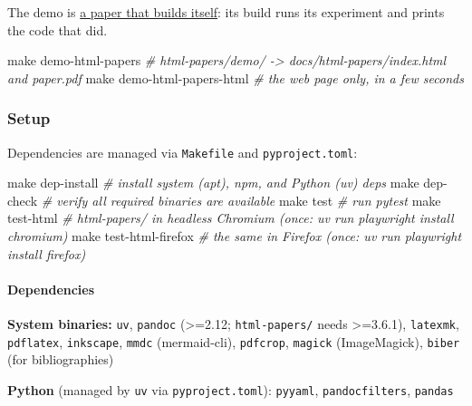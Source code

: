 \documentclass[
]{article}
\newenvironment{Shaded}{}{}
\newcommand{\CommentTok}[1]{\textcolor[rgb]{0.38,0.63,0.69}{\textit{#1}}}
\newcommand{\FunctionTok}[1]{\textcolor[rgb]{0.02,0.16,0.49}{#1}}
\newcommand{\NormalTok}[1]{#1}
\begin{document}
The demo is \href{https://mivanit.github.io/pandoc-utils/html-papers/}{a
paper that builds itself}: its build runs its experiment and prints the
code that did.

\begin{Shaded}
\begin{Highlighting}[]
\FunctionTok{make}\NormalTok{ demo{-}html{-}papers        }\CommentTok{\# html{-}papers/demo/ {-}\textgreater{} docs/html{-}papers/index.html and paper.pdf}
\FunctionTok{make}\NormalTok{ demo{-}html{-}papers{-}html   }\CommentTok{\# the web page only, in a few seconds}
\end{Highlighting}
\end{Shaded}

\subsubsection{Setup}\label{setup}

Dependencies are managed via \texttt{Makefile} and
\texttt{pyproject.toml}:

\begin{Shaded}
\begin{Highlighting}[]
\FunctionTok{make}\NormalTok{ dep{-}install   }\CommentTok{\# install system (apt), npm, and Python (uv) deps}
\FunctionTok{make}\NormalTok{ dep{-}check     }\CommentTok{\# verify all required binaries are available}
\FunctionTok{make}\NormalTok{ test          }\CommentTok{\# run pytest}
\FunctionTok{make}\NormalTok{ test{-}html     }\CommentTok{\# html{-}papers/ in headless Chromium (once: uv run playwright install chromium)}
\FunctionTok{make}\NormalTok{ test{-}html{-}firefox  }\CommentTok{\# the same in Firefox (once: uv run playwright install firefox)}
\end{Highlighting}
\end{Shaded}

\paragraph{Dependencies}\label{dependencies}

\textbf{System binaries:} \texttt{uv}, \texttt{pandoc}
(\textgreater=2.12; \texttt{html-papers/} needs \textgreater=3.6.1),
\texttt{latexmk}, \texttt{pdflatex}, \texttt{inkscape}, \texttt{mmdc}
(mermaid-cli), \texttt{pdfcrop}, \texttt{magick} (ImageMagick),
\texttt{biber} (for bibliographies)

\textbf{Python} (managed by \texttt{uv} via \texttt{pyproject.toml}):
\texttt{pyyaml}, \texttt{pandocfilters}, \texttt{pandas}
\end{document}
